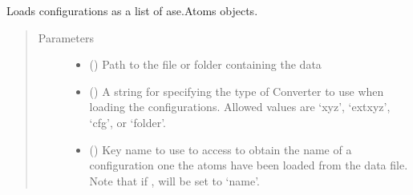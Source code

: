 \documentclass[letterpaper,10pt,english]{sphinxmanual}
\begin{document}
\label{\detokenize{dataset:module-colabfit.tools.dataset}}

\begin{fulllineitems}
\label{\detokenize{dataset:colabfit.tools.dataset.load_data}}
\sphinxAtStartPar
Loads configurations as a list of ase.Atoms objects.
\begin{quote}\begin{description}
\item[{Parameters}] \leavevmode\begin{itemize}
\item {} 
\sphinxAtStartPar
{} () \textendash{} Path to the file or folder containing the data

\item {} 
\sphinxAtStartPar
{} () \textendash{} A string for specifying the type of Converter to use when loading
the configurations. Allowed values are ‘xyz’, ‘extxyz’, ‘cfg’, or
‘folder’.

\item {} 
\sphinxAtStartPar
{} () \textendash{} Key name to use to access  to
obtain the name of a configuration one the atoms have been
loaded from the data file. Note that if
,  will be set to ‘name’.


\end{itemize}
\end{description}
\end{quote}
\end{fulllineitems}
\end{document}
